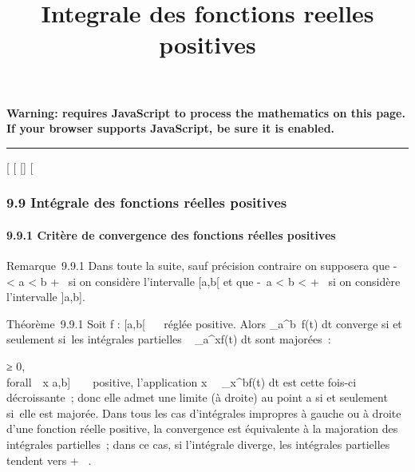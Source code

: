 \documentclass[]{article}
\title{Integrale des fonctions reelles positives}
\author{}
\date{}
\begin{document}
\maketitle

\textbf{Warning: 
requires JavaScript to process the mathematics on this page.\\ If your
browser supports JavaScript, be sure it is enabled.}

\begin{center}\rule{3in}{0.4pt}\end{center}

[
[
[]
[

\subsubsection{9.9 Intégrale des fonctions réelles positives}

\paragraph{9.9.1 Critère de convergence des fonctions réelles positives}

Remarque~9.9.1 Dans toute la suite, sauf précision contraire on
supposera que -\infty~ < a < b \leq +\infty~ si on considère
l'intervalle [a,b[ et que -\infty~\leq a < b < +\infty~ si on
considère l'intervalle ]a,b].

Théorème~9.9.1 Soit f : [a,b[\rightarrow~ ~ réglée positive. Alors
\int  _a^b~f(t) dt converge si et
seulement si~les intégrales partielles \int ~
_a^xf(t) dt sont majorées~:

\existsM ≥ 0, \\forall~~x \in
[a,b[, \int  _a^x~f(t) dt \leq M

Démonstration Si a \leq x < x' < b, on a
\int  _a^x'~f(t) dt
-\int  _a^x~f(t) dt
=\int  _x^x'~f(t) dt ≥ 0, dont
l'application x\mapsto~\\int
 _a^xf(t) dt est croissante. En conséquence, elle admet
une limite au point b si et seulement si~elle est majorée.

Remarque~9.9.2 Dans le cas d'une fonction réglée f :]a,b] \rightarrow~ ~
positive, l'application
x\mapsto~\int ~
_x^bf(t) dt est cette fois-ci décroissante~; donc elle
admet une limite (à droite) au point a si et seulement si~elle est
majorée. Dans tous les cas d'intégrales impropres à gauche ou à droite
d'une fonction réelle positive, la convergence est équivalente à la
majoration des intégrales partielles~; dans ce cas, si l'intégrale
diverge, les intégrales partielles tendent vers + \infty~.
\end{document}
